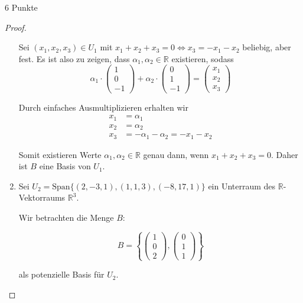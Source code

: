 \documentclass{problemset}
\begin{document}
\begin{problem}{6 Punkte}
\begin{proof}
\begin{enumerate}
		      Sei $(x_1, x_2, x_3) \in U_1$ mit $x_1 + x_2 + x_3 = 0 \Leftrightarrow x_3 = - x_1 - x_2$ beliebig, aber fest. Es ist also zu zeigen, dass $\alpha_1, \alpha_2 \in \mathbb{R}$ existieren, sodass
		      \[
			      \alpha_1 \cdot \begin{pmatrix}
				      1 \\
				      0 \\
				      -1
			      \end{pmatrix} + \alpha_2 \cdot \begin{pmatrix}
				      0 \\
				      1 \\
				      -1
			      \end{pmatrix} = \begin{pmatrix}
				      x_1 \\
				      x_2 \\
				      x_3
			      \end{pmatrix}
		      \]

		      Durch einfaches Ausmultiplizieren erhalten wir
		      \begin{align*}
			      x_1 & = \alpha_1                                             \\
			      x_2 & = \alpha_2                                             \\
			      x_3 & = - \alpha_1 - \alpha_2 = - x_1 - x_2 \tag{\checkmark}
		      \end{align*}

		      Somit existieren Werte $\alpha_1, \alpha_2 \in \mathbb{R}$ genau dann, wenn $x_1 + x_2 + x_3 = 0$. Daher ist $B$ eine Basis von $U_1$.
		\item Sei $U_2 = \text{Span}\{(2, -3, 1), (1, 1, 3), (-8, 17, 1)\}$ ein Unterraum des $\mathbb{R}$-Vektorraums $\mathbb{R}^3$.

		      Wir betrachten die Menge $B$:

		      \[
			      B = \left\{
			      \begin{pmatrix}
				      1 \\ 0 \\ 2
			      \end{pmatrix},
			      \begin{pmatrix}
				      0 \\ 1 \\ 1
			      \end{pmatrix}
			      \right\}
		      \]

		      als potenzielle Basis für $U_2$.


\end{enumerate}
\end{proof}
\end{problem}
\end{document}
